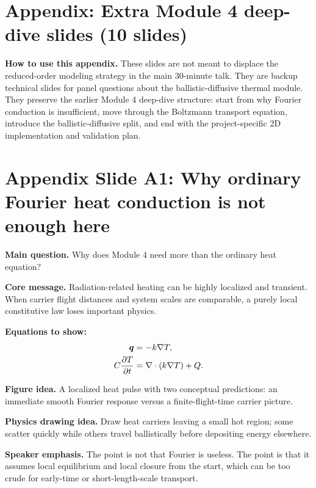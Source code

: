 \documentclass[11pt]{article}
\begin{document}
\section{Appendix: Extra Module 4 deep-dive slides (10 slides)}

\begin{notebox}
\textbf{How to use this appendix.} These slides are not meant to displace the reduced-order modeling strategy in the main 30-minute talk. They are backup technical slides for panel questions about the ballistic-diffusive thermal module. They preserve the earlier Module 4 deep-dive structure: start from why Fourier conduction is insufficient, move through the Boltzmann transport equation, introduce the ballistic-diffusive split, and end with the project-specific 2D implementation and validation plan.
\end{notebox}

\section{Appendix Slide A1: Why ordinary Fourier heat conduction is not enough here}
\begin{physicsbox}
\textbf{Main question.} Why does Module 4 need more than the ordinary heat equation?
\end{physicsbox}

\textbf{Core message.} Radiation-related heating can be highly localized and transient. When carrier flight distances and system scales are comparable, a purely local constitutive law loses important physics.

\textbf{Equations to show:}
\begin{align*}
\bm{q}&=-k\nabla T,\\
C\frac{\partial T}{\partial t}&=\nabla\cdot(k\nabla T)+Q.
\end{align*}

\textbf{Figure idea.} A localized heat pulse with two conceptual predictions: an immediate smooth Fourier response versus a finite-flight-time carrier picture.

\textbf{Physics drawing idea.} Draw heat carriers leaving a small hot region; some scatter quickly while others travel ballistically before depositing energy elsewhere.

\textbf{Speaker emphasis.} The point is not that Fourier is useless. The point is that it assumes local equilibrium and local closure from the start, which can be too crude for early-time or short-length-scale transport.
\end{document}
